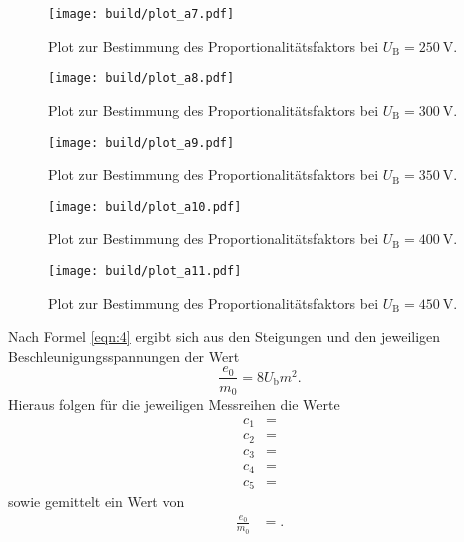 \begin{figure}
  \centering
  \texttt{[image: build/plot\_a7.pdf]}
  \caption{Plot zur Bestimmung des Proportionalitätsfaktors bei $U_{\text{B}} = \SI{250}{\volt}$.}
  \label{plot:7}
\end{figure}

\begin{figure}
  \centering
  \texttt{[image: build/plot\_a8.pdf]}
  \caption{Plot zur Bestimmung des Proportionalitätsfaktors bei $U_{\text{B}} = \SI{300}{\volt}$.}
  \label{plot:8}
\end{figure}

\begin{figure}
  \centering
  \texttt{[image: build/plot\_a9.pdf]}
  \caption{Plot zur Bestimmung des Proportionalitätsfaktors bei $U_{\text{B}} = \SI{350}{\volt}$.}
  \label{plot:9}
\end{figure}

\begin{figure}
  \centering
  \texttt{[image: build/plot\_a10.pdf]}
  \caption{Plot zur Bestimmung des Proportionalitätsfaktors bei $U_{\text{B}} = \SI{400}{\volt}$.}
  \label{plot:10}
\end{figure}

\begin{figure}
  \centering
  \texttt{[image: build/plot\_a11.pdf]}
  \caption{Plot zur Bestimmung des Proportionalitätsfaktors bei $U_{\text{B}} = \SI{450}{\volt}$.}
  \label{plot:11}
\end{figure}

Nach Formel \eqref{eqn:4} ergibt sich aus den Steigungen und den jeweiligen Beschleunigungsspannungen der Wert
\begin{equation}
  \frac{e_0}{m_0} = 8 U_\text{b} m^2.
\end{equation}
Hieraus folgen für die jeweiligen Messreihen die Werte
\begin{align*}
  c_1 &=  \\
  c_2 &=  \\
  c_3 &=  \\
  c_4 &=  \\
  c_5 &= 
\end{align*}
sowie gemittelt ein Wert von
\begin{align*}
  \frac{e_0}{m_0} &= . \\
\end{align*}

